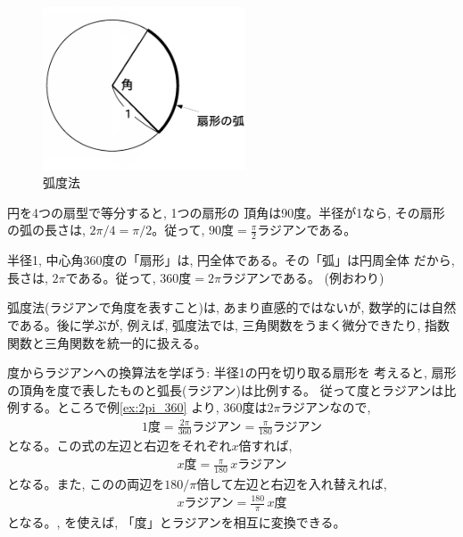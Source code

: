 
\begin{figure}[h]
    \centering
    \includegraphics[width=6cm]{radian_illust.eps}
    \caption{弧度法}\label{fig:radian_illust}
\end{figure}

\begin{exmpl} 円を4つの扇型で等分すると, 1つの扇形の
頂角は90度。半径が1なら, その扇形の弧の長さは, 
$2\pi/4=\pi/2$。従って, $90\text{度}=\frac{\pi}{2}\text{ラジアン}$である。
\end{exmpl}

\begin{exmpl}\label{ex:2pi_360} 半径1, 中心角360度の「扇形」は, 円全体である。その「弧」は円周全体
だから, 長さは, $2\pi$である。従って, $360\text{度}=2\pi\text{ラジアン}$である。
(例おわり)\end{exmpl}\mv

弧度法(ラジアンで角度を表すこと)は, あまり直感的ではないが, 
数学的には自然である。後に学ぶが, 例えば, 弧度法では, 
三角関数をうまく微分できたり, 指数関数と三角関数を統一的に扱える。\hv

度からラジアンへの換算法を学ぼう: 半径1の円を切り取る扇形を
考えると, 扇形の頂角を度で表したものと弧長(ラジアン)は比例する。
従って度とラジアンは比例する。ところで例\ref{ex:2pi_360}
より, 360度は$2\pi$ラジアンなので, 
\begin{eqnarray}1\text{度}=\frac{2\pi}{360}\text{ラジアン}=\frac{\pi}{180}\text{ラジアン}\end{eqnarray}
となる。この式の左辺と右辺をそれぞれ$x$倍すれば, 
\begin{eqnarray}x\text{度}=\frac{\pi}{180}\,x\text{ラジアン}\label{eq:deg2rad}\end{eqnarray}
となる。また, このの両辺を$180/\pi$倍して左辺と右辺を入れ替えれば, 
\begin{eqnarray}x\text{ラジアン}=\frac{180}{\pi}\,x\text{度}\label{eq:rad2deg}\end{eqnarray}
となる。, を使えば, 「度」とラジアンを相互に変換できる。\mv

